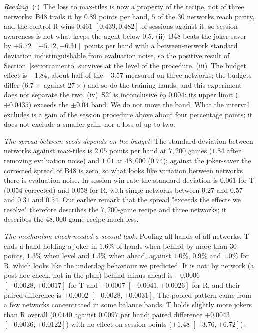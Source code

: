 \documentclass[11pt]{article}
\begin{document}
\emph{Reading.} (i)~The loss to max-tiles is now a property of the recipe, not of three networks: B48 trails it by $0.89$ points per hand, $5$ of the $30$ networks reach parity, and the control R wins $0.461$ $[0.439,0.482]$ of sessions against it, so session-awareness is not what keeps the agent below $0.5$. (ii)~B48 beats the joker-saver by $+5.72$ $[+5.12,+6.31]$ points per hand with a between-network standard deviation indistinguishable from evaluation noise, so the positive result of Section~\ref{sec:orcamento} survives at the level of the procedure. (iii)~The budget effect is $+1.84$, about half of the $+3.57$ measured on three networks; the budgets differ ($6.7\times$ against $27\times$) and so do the training hands, and this experiment does not separate the two. (iv)~S2$'$ is inconclusive \emph{by $0.004$}: its upper limit ($+0.0435$) exceeds the $\pm0.04$ band. We do not move the band. What the interval excludes is a gain of the session procedure above about four percentage points; it does not exclude a smaller gain, nor a loss of up to two.

\emph{The spread between seeds depends on the budget.} The standard deviation between networks against max-tiles is $2.05$ points per hand at $7{,}200$ games ($1.84$ after removing evaluation noise) and $1.01$ at $48{,}000$ ($0.74$); against the joker-saver the corrected spread of B48 is zero, so what looks like variation between networks there is evaluation noise. In session win rate the standard deviation is $0.061$ for T ($0.054$ corrected) and $0.058$ for R, with single networks between $0.27$ and $0.57$ and $0.31$ and $0.54$. Our earlier remark that the spread "exceeds the effects we resolve" therefore describes the $7{,}200$-game recipe and three networks; it describes the $48{,}000$-game recipe much less.

\emph{The mechanism check needed a second look.} Pooling all hands of all networks, T ends a hand holding a joker in $1.6\%$ of hands when behind by more than $30$ points, $1.3\%$ when level and $1.3\%$ when ahead, against $1.0\%$, $0.9\%$ and $1.0\%$ for R, which looks like the underdog behaviour we predicted. It is not: by network (a post hoc check, not in the plan) behind minus ahead is $-0.0006$ $[-0.0028,+0.0017]$ for T and $-0.0007$ $[-0.0041,+0.0026]$ for R, and their paired difference is $+0.0002$ $[-0.0028,+0.0031]$. The pooled pattern came from a few networks concentrated in some balance bands. T holds slightly more jokers than R overall ($0.0140$ against $0.0097$ per hand; paired difference $+0.0043$ $[-0.0036,+0.0122]$) with no effect on session points ($+1.48$ $[-3.76,+6.72]$).
\end{document}
